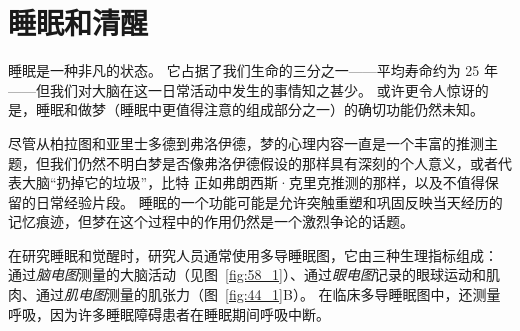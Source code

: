 \chapter{睡眠和清醒} \label{chap:chap44}

睡眠是一种非凡的状态。
它占据了我们生命的三分之一——平均寿命约为 25 年——但我们对大脑在这一日常活动中发生的事情知之甚少。
或许更令人惊讶的是，睡眠和做梦（睡眠中更值得注意的组成部分之一）的确切功能仍然未知。


尽管从柏拉图和亚里士多德到弗洛伊德，梦的心理内容一直是一个丰富的推测主题，但我们仍然不明白梦是否像弗洛伊德假设的那样具有深刻的个人意义，或者代表大脑“扔掉它的垃圾”，比特 正如弗朗西斯·克里克推测的那样，以及不值得保留的日常经验片段。
睡眠的一个功能可能是允许突触重塑和巩固反映当天经历的记忆痕迹，但梦在这个过程中的作用仍然是一个激烈争论的话题。


在研究睡眠和觉醒时，研究人员通常使用多导睡眠图，它由三种生理指标组成：
通过\textit{脑电图}测量的大脑活动（见图~\ref{fig:58_1}）、通过\textit{眼电图}记录的眼球运动和肌肉、通过\textit{肌电图}测量的肌张力（图~\ref{fig:44_1}B）。 
在临床多导睡眠图中，还测量呼吸，因为许多睡眠障碍患者在睡眠期间呼吸中断。


